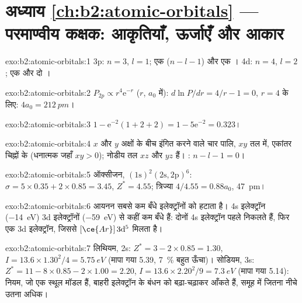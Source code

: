 \section*{अध्याय \ref{ch:b2:atomic-orbitals} --- परमाण्वीय कक्षक: आकृतियाँ, ऊर्जाएँ और आकार}

\begin{solution}{exo:b2:atomic-orbitals:1}
3p: $n = 3$, $l = 1$; एक  ($n - l - 1$) और एक । 4d: $n = 4$,
$l = 2$; एक  और दो ।
\end{solution}

\begin{solution}{exo:b2:atomic-orbitals:2}
$P_{2p} \propto r^4\mathrm e^{-r}$ ($r$, $a_0$ में): $d\ln P/dr = 4/r - 1 = 0$, $r = 4$ के लिए:
$4a_0 = \qty{212}{pm}$।
\end{solution}

\begin{solution}{exo:b2:atomic-orbitals:3}
$1 - \mathrm e^{-2}(1 + 2 + 2) = 1 - 5\mathrm e^{-2} = 0.323$।
\end{solution}

\begin{solution}{exo:b2:atomic-orbitals:4}
$x$ और $y$ अक्षों के बीच इंगित करने वाले चार पालि, $xy$ तल में, एकांतर
चिह्नों के (धनात्मक जहाँ $xy > 0$); नोडीय तल $xz$ और $yz$ हैं। :
$n - l - 1 = 0$।
\end{solution}

\begin{solution}{exo:b2:atomic-orbitals:5}
ऑक्सीजन, $(1\mathrm s)^2(2\mathrm s, 2\mathrm p)^6$: $\sigma = 5 \times 0.35 + 2 \times 0.85
= 3.45$, $Z^* = 4.55$; त्रिज्या $4/4.55 = 0.88a_0$, \qty{47}{pm}।
\end{solution}

\begin{solution}{exo:b2:atomic-orbitals:6}
आयनन सबसे कम बँधे इलेक्ट्रॉनों को हटाता है। 4s इलेक्ट्रॉन
(\qty{-14}{eV}) 3d इलेक्ट्रॉनों (\qty{-59}{eV}) से कहीं कम बँधे हैं: दोनों 4s
इलेक्ट्रॉन पहले निकलते हैं, फिर एक 3d इलेक्ट्रॉन, जिससे $[\ce{Ar}]\,3\mathrm d^5$ मिलता है।
\end{solution}

\begin{solution}{exo:b2:atomic-orbitals:7}
लिथियम, 2s: $Z^* = 3 - 2 \times 0.85 = 1.30$, $I = 13.6 \times 1.30^2/4 =
\qty{5.75}{eV}$ (मापा गया 5.39, 7~\% बहुत ऊँचा)। सोडियम, 3s: $Z^* = 11 - 8 \times 0.85 -
2 \times 1.00 = 2.20$, $I = 13.6 \times 2.20^2/9 = \qty{7.3}{eV}$ (मापा गया 5.14):
नियम, जो एक स्थूल मॉडल हैं, बाहरी इलेक्ट्रॉन के बंधन को बढ़ा-चढ़ाकर आँकते हैं, समूह में
जितना नीचे उतना अधिक।
\end{solution}

